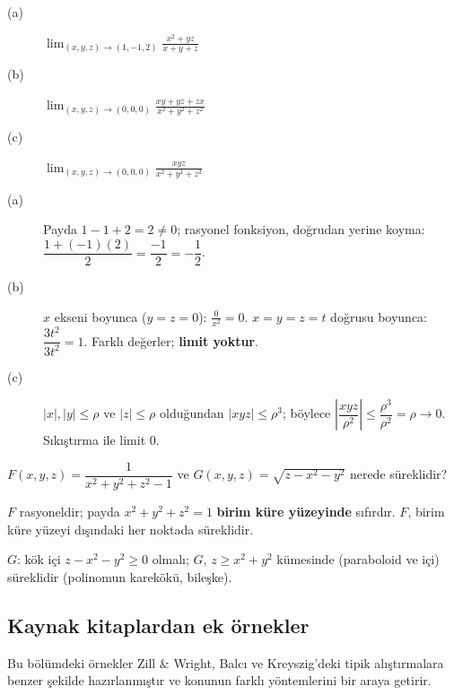 \begin{soru}
\begin{description}
  \item[(a)] $\displaystyle\lim_{(x,y,z)\to(1,-1,2)}\frac{x^2+yz}{x+y+z}$
  \item[(b)] $\displaystyle\lim_{(x,y,z)\to(0,0,0)}\frac{xy+yz+zx}{x^2+y^2+z^2}$
  \item[(c)] $\displaystyle\lim_{(x,y,z)\to(0,0,0)}\frac{xyz}{x^2+y^2+z^2}$
\end{description}
\end{soru}
\begin{cevap}
\begin{description}
  \item[(a)] Payda $1-1+2=2\neq0$; rasyonel fonksiyon, doğrudan yerine koyma:
  $\dfrac{1+(-1)(2)}{2}=\dfrac{-1}{2}=-\dfrac12$.
  \item[(b)] $x$ ekseni boyunca ($y=z=0$): $\frac{0}{x^2}=0$. $x=y=z=t$ doğrusu boyunca:
  $\dfrac{3t^2}{3t^2}=1$. Farklı değerler; \textbf{limit yoktur}.
  \item[(c)] $|x|,|y|\le\rho$ ve $|z|\le\rho$ olduğundan $|xyz|\le\rho^3$; böylece
  $\left|\dfrac{xyz}{\rho^2}\right|\le\dfrac{\rho^3}{\rho^2}=\rho\to0$. Sıkıştırma ile limit $0$.
\end{description}
\end{cevap}

\begin{soru}
$F(x,y,z)=\dfrac{1}{x^2+y^2+z^2-1}$ ve $G(x,y,z)=\sqrt{z-x^2-y^2}$ nerede süreklidir?
\end{soru}
\begin{cevap}
$F$ rasyoneldir; payda $x^2+y^2+z^2=1$ \textbf{birim küre yüzeyinde} sıfırdır. $F$, birim küre yüzeyi dışındaki her
noktada süreklidir.

$G$: kök içi $z-x^2-y^2\ge0$ olmalı; $G$, $z\ge x^2+y^2$ kümesinde (paraboloid ve içi) süreklidir (polinomun karekökü,
bileşke).
\end{cevap}

\subsection{Kaynak kitaplardan ek örnekler}

Bu bölümdeki örnekler Zill \& Wright, Balcı ve Kreyszig'deki tipik alıştırmalara benzer şekilde hazırlanmıştır ve konunun
farklı yöntemlerini bir araya getirir.

